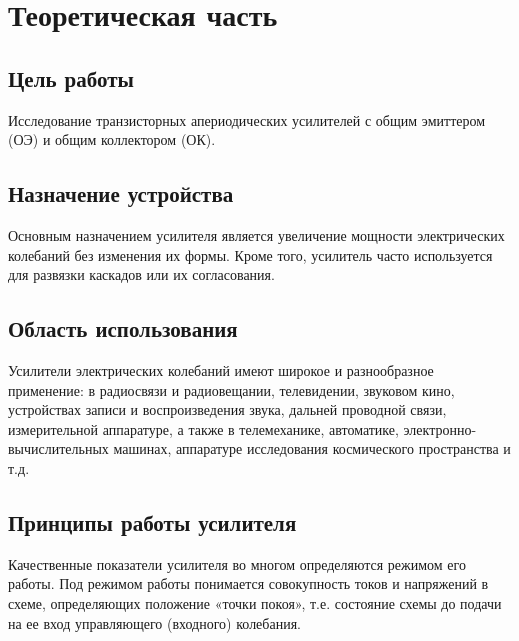 



\def\labauthors{Войтович Д.А., Карусевич А.А., Разова А.А.}
\def\labgroup{430}
\def\labnumber{5}
\def\labtheme{Апериодический усилитель}
\renewcommand{\vec}{\mathbf}
\renewcommand{\Re}{\operatorname{Re}}
\renewcommand{\Im}{\operatorname{Im}}
\renewcommand{\phi}{\varphi}
\renewcommand{\hat}{\widehat}



\newpage

\section{Теоретическая часть}
\subsection{Цель работы}
Исследование транзисторных апериодических усилителей с общим эмиттером (ОЭ) и общим коллектором (ОК).

\subsection{Назначение устройства}
Основным назначением усилителя является увеличение мощности электрических колебаний без изменения их формы. Кроме того, усилитель часто используется для развязки каскадов или их согласования.

\subsection{Область использования}
Усилители электрических колебаний имеют широкое и разнообразное применение: в радиосвязи и радиовещании, телевидении, звуковом кино, устройствах записи и воспроизведения звука, дальней проводной связи, измерительной аппаратуре, а также в телемеханике, автоматике, электронно-вычислительных машинах, аппаратуре исследования космического пространства и т.д.

\subsection{\textbf{Принципы работы усилителя}}
Качественные показатели усилителя во многом определяются режимом его работы. Под режимом работы понимается совокупность токов и напряжений в схеме, определяющих положение «точки покоя», т.е. состояние схемы до подачи на ее вход управляющего (входного) колебания.

